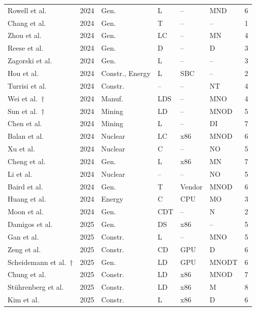 \begin{longtable}{lllllll}
Rowell et al.~\cite{inc:paper041} & 2024 & Gen. & L & -- & MND & 6\\
Chang et al.~\cite{inc:paper012} & 2024 & Gen. & T & -- & -- & 1\\
Zhou et al.~\cite{inc:paper015} & 2024 & Gen. & LC & -- & MN & 4\\
Reese et al.~\cite{inc:paper037} & 2024 & Gen. & D & -- & D & 3\\
Zagorski et al.~\cite{inc:paper082} & 2024 & Gen. & L & -- & -- & 3\\
Hou et al.~\cite{inc:paper039} & 2024 & Constr., Energy & L & SBC & -- & 2\\
Turrisi et al.~\cite{inc:paper074} & 2024 & Constr. & -- & -- & NT & 4\\
Wei et al.~\cite{inc:paper033}$\dagger$ & 2024 & Manuf. & LDS & -- & MNO & 4\\
Sun et al.~\cite{inc:paper076}$\dagger$ & 2024 & Mining & LD & -- & MNOD & 5\\
Chen et al.~\cite{inc:paper048} & 2024 & Mining & L & -- & DI & 7\\
Balan et al.~\cite{inc:paper035} & 2024 & Nuclear & LC & x86 & MNOD & 6\\
Xu et al.~\cite{inc:paper049} & 2024 & Nuclear & C & -- & NO & 5\\
Cheng et al.~\cite{inc:paper023} & 2024 & Gen. & L & x86 & MN & 7\\
Li et al.~\cite{inc:r2-0771} & 2024 & Nuclear & -- & -- & NO & 5\\
Baird et al.~\cite{inc:r2-1052} & 2024 & Gen. & T & Vendor & MNOD & 6\\
Huang et al.~\cite{inc:r2-1239} & 2024 & Energy & C & CPU & MO & 3\\
Moon et al.~\cite{inc:r2-1169} & 2024 & Gen. & CDT & -- & N & 2\\
Damigos et al.~\cite{inc:paper042} & 2025 & Gen. & DS & x86 & -- & 5\\
Gan et al.~\cite{inc:paper047} & 2025 & Constr. & L & -- & MNO & 5\\
Zeng et al.~\cite{inc:paper003} & 2025 & Constr. & CD & GPU & D & 6\\
Scheidemann et al.~\cite{inc:paper030}$\dagger$ & 2025 & Gen. & LD & GPU & MNODT & 6\\
Chung et al.~\cite{inc:paper053} & 2025 & Constr. & LD & x86 & MNOD & 7\\
Stührenberg et al.~\cite{inc:paper057} & 2025 & Constr. & LD & x86 & M & 8\\
Kim et al.~\cite{inc:paper061} & 2025 & Constr. & L & x86 & D & 6\\

\end{longtable}
